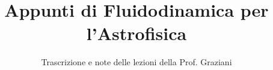\documentclass[a4paper,12pt]{article}
\title{Appunti di Fluidodinamica per l'Astrofisica}
\author{Trascrizione e note delle lezioni della Prof. Graziani}
\date{}
\begin{document}
\maketitle
\projectintro
\tableofcontents
\newpage

\end{document}
